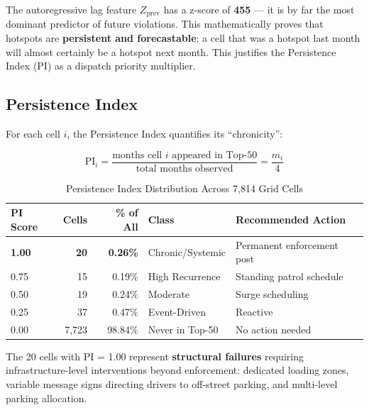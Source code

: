 \documentclass[12pt,a4paper]{article}
\begin{document}
\begin{tcolorbox}[resultbox, title={Key Finding: Persistence is Predictability}]
The autoregressive lag feature $Z_\text{prev}$ has a z-score of \textbf{455} — it is by far the most dominant predictor of future violations. This mathematically proves that hotspots are \textbf{persistent and forecastable}: a cell that was a hotspot last month will almost certainly be a hotspot next month. This justifies the Persistence Index (PI) as a dispatch priority multiplier.
\end{tcolorbox}

\subsection{Persistence Index}

For each cell $i$, the Persistence Index quantifies its ``chronicity'':

\begin{tcolorbox}[formulabox]
\begin{equation}
    \text{PI}_i = \frac{\text{months cell } i \text{ appeared in Top-50}}{\text{total months observed}} = \frac{m_i}{4}
    \label{eq:pi}
\end{equation}
\end{tcolorbox}

\begin{table}[H]
\centering
\caption{Persistence Index Distribution Across 7,814 Grid Cells}
\begin{tabular}{lrrlp{4.5cm}}
\toprule
\textbf{PI Score} & \textbf{Cells} & \textbf{\% of All} & \textbf{Class} & \textbf{Recommended Action} \\
\midrule
\rowcolor{alertred!10} \textbf{1.00} & \textbf{20} & \textbf{0.26\%} & Chronic/Systemic & Permanent enforcement post \\
\rowcolor{gold!10} 0.75 & 15 & 0.19\% & High Recurrence & Standing patrol schedule \\
0.50 & 19 & 0.24\% & Moderate & Surge scheduling \\
0.25 & 37 & 0.47\% & Event-Driven & Reactive \\
\rowcolor{emerald!10} 0.00 & 7,723 & 98.84\% & Never in Top-50 & No action needed \\
\bottomrule
\end{tabular}
\end{table}

The 20 cells with PI = 1.00 represent \textbf{structural failures} requiring infrastructure-level interventions beyond enforcement: dedicated loading zones, variable message signs directing drivers to off-street parking, and multi-level parking allocation.
\end{document}
